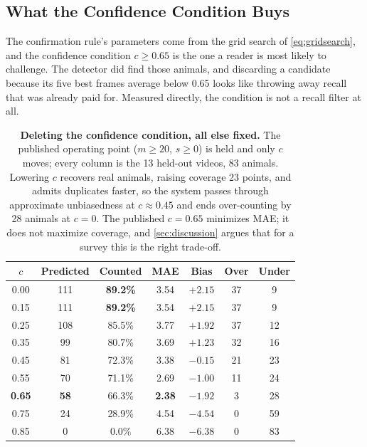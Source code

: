 \subsection{What the Confidence Condition Buys}
\label{sec:sensitivity}

The confirmation rule's parameters come from the grid search of \cref{eq:gridsearch}, and
the confidence condition $c\ge0.65$ is the one a reader is most likely to challenge. The
detector did find those animals, and discarding a candidate because its five best frames
average below 0.65 looks like throwing away recall that was already paid for. Measured
directly, the condition is not a recall filter at all.

\begin{table}[htbp]
\caption{\textbf{Deleting the confidence condition, all else fixed.} The published operating
point ($m\ge20$, $s\ge0$) is held and only $c$ moves; every column is the 13 held-out videos,
83 animals. Lowering $c$ recovers real animals, raising coverage 23 points, and admits duplicates faster, so the system passes through approximate unbiasedness at $c\approx0.45$
and ends over-counting by 28 animals at $c=0$. The published $c=0.65$ minimizes MAE; it does
not maximize coverage, and \cref{sec:discussion} argues that for a survey this is the right
trade-off.\label{tab:confsens}}
\centering
\begin{tabularx}{\textwidth}{CCCCCCC}
\toprule
\textbf{$c$} & \textbf{Predicted} & \textbf{Counted} & \textbf{MAE} & \textbf{Bias} & \textbf{Over} & \textbf{Under} \\
 & 111 & \textbf{89.2\%} & 3.54 & $+2.15$ & 37 & 9 \\
0.15 & 111 & \textbf{89.2\%} & 3.54 & $+2.15$ & 37 & 9 \\
0.25 & 108 & 85.5\% & 3.77 & $+1.92$ & 37 & 12 \\
0.35 &  99 & 80.7\% & 3.69 & $+1.23$ & 32 & 16 \\
0.45 &  81 & 72.3\% & 3.38 & $\mathbf{-0.15}$ & 21 & 23 \\
0.55 &  70 & 71.1\% & 2.69 & $-1.00$ & 11 & 24 \\
\textbf{0.65} & \textbf{58} & 66.3\% & \textbf{2.38} & $-1.92$ & 3 & 28 \\
0.75 &  24 & 28.9\% & 4.54 & $-4.54$ & 0 & 59 \\
0.85 &   0 &  0.0\% & 6.38 & $-6.38$ & 0 & 83 \\
\bottomrule
\end{tabularx}
\end{table}

